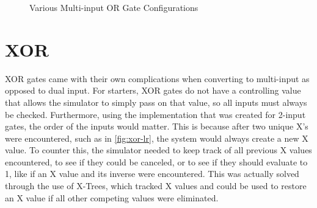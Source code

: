 \documentclass[12pt]{report}
\begin{document}
\begin{figure}[h!]
	\centering
	
	\label{fig:or-group}
	\caption[Multi-input OR Gates]{Various Multi-input OR Gate Configurations}
\end{figure}

\section{XOR}\label{sec:xor}

XOR gates came with their own complications when converting to multi-input as opposed to dual input. For starters, XOR gates do not have a controlling value that allows the simulator to simply pass on that value, so all inputs must always be checked. Furthermore, using the implementation that was created for 2-input gates, the order of the inputs would matter. This is because after two unique X's were encountered, such as in \cref{fig:xor-lr}, the system would always create a new X value. To counter this, the simulator needed to keep track of all previous X values encountered, to see if they could be canceled, or to see if they should evaluate to 1, like if an X value and its inverse were encountered. This was actually solved through the use of X-Trees, which tracked X values and could be used to restore an X value if all other competing values were eliminated.
\end{document}
